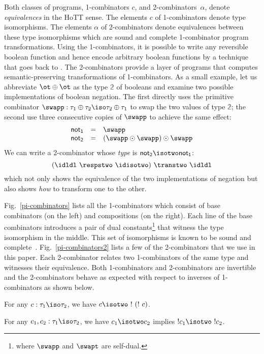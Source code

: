 \noindent Both classes of programs, 1-combinators $c$, and
2-combinators~$\alpha$, denote \emph{equivalences} in the HoTT
sense. The elements $c$ of 1-combinators denote type isomorphisms. The
elements $\alpha$ of 2-combinators denote equivalences between these
type isomorphisms which are sound and complete 1-combinator program
transformations. Using the 1-combinators, it is possible to write any
reversible boolean function and hence encode arbitrary boolean
functions by a technique that goes back to \citet{Toffoli:1980}. The
2-combinators provide a layer of programs that computes
semantic-preserving transformations of 1-combinators. As a small
example, let us abbreviate $\ot \oplus \ot$ as the type $\mathbb{2}$
of booleans and examine two possible implementations of boolean
negation. The first directly uses the primitive combinator
$\swapp : \tau_1 \oplus \tau_2 \iso \tau_2 \oplus \tau_1$ to swap the
two values of type $\mathbb{2}$; the second use three consecutive
copies of $\swapp$ to achieve the same effect:
\[\begin{array}{rcl}
\mathsf{not_1} &=& \swapp \\
\mathsf{not_2} &=& (\swapp \odot \swapp) \odot \swapp 
\end{array}\]
We can write a 2-combinator whose \emph{type} is $\mathsf{not_2}
\isotwo \mathsf{not_1}$:
\[
(\idldl ~\respstwo~ \idisotwo)~\transtwo~\idldl
\]
which not only shows the equivalence of the two implementations of
negation but also shows \emph{how} to transform one to the other.

Fig.~\ref{pi-combinators} lists all the 1-combinators which consist of
base combinators (on the left) and compositions (on the right). Each
line of the base combinators introduces a pair of dual
constants\footnote{where $\swapp$ and $\swapt$ are self-dual.} that
witness the type isomorphism in the middle. This set of isomorphisms
is known to be sound and
complete~\cite{Fiore:2004,fiore-remarks}. Fig.~\ref{pi-combinators2}
lists a few of the 2-combinators that we use in this paper. Each
2-combinator relates two 1-combinators of the same type and witnesses
their equivalence. Both 1-combinators and 2-combinators are invertible
and the 2-combinators behave as expected with respect to inverses of
1-combinators as shown below.

\begin{proposition}
For any $c : \tau_1 \iso \tau_2$, we have $c \isotwo ~!~(!~c)$.
\end{proposition} 

\begin{proposition}
For any $c_1,c_2 : \tau_1 \iso \tau_2$, we have $c_1 \isotwo c_2$ implies
$!c_1 \isotwo ~!c_2$.
\end{proposition} 

